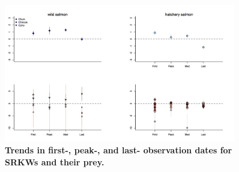 \documentclass{article}
\begin{document}
 

 
 
\begin{figure}[h!]
\includegraphics[width=0.9\textwidth]{../analyses/figures/srkw_salmon_shifts_lm.png} 
\caption{\textbf{Trends in first-, peak-, and last- observation dates for SRKWs and their prey.}}
 \label{fig:shifts}
 \end{figure}

\end{document}
